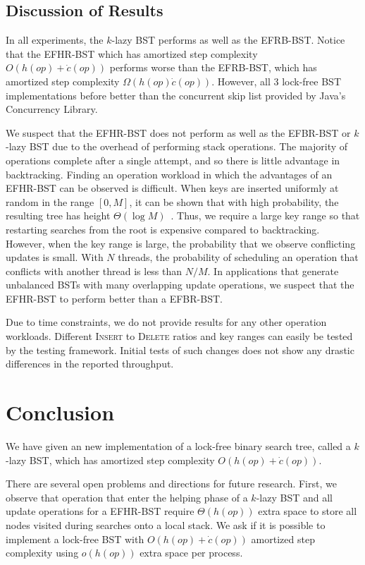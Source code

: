 \documentclass[letterpaper]{article}
\begin{document}
\subsection{Discussion of Results}
In all experiments, the $k$-lazy BST performs as well as the EFRB-BST. Notice that the EFHR-BST which has amortized step complexity $O(h(op) + \dot{c}(op))$ performs worse than the EFRB-BST, which has amortized step complexity $\Omega(h(op)\dot{c}(op))$. However, all 3 lock-free BST implementations before better than the concurrent skip list provided by Java's Concurrency Library. 

We suspect that the EFHR-BST does not perform as well as the EFBR-BST or $k$-lazy BST due to the overhead of performing stack operations. The majority of operations complete after a single attempt, and so there is little advantage in backtracking. Finding an operation workload in which the advantages of an EFHR-BST can be observed is difficult. When keys are inserted uniformly at random in the range $[0,M]$, it can be shown that with high probability, the resulting tree has height $\Theta(\log M)$~\cite{CLRS}. Thus, we require a large key range so that restarting searches from the root is expensive compared to backtracking. However, when the key range is large, the probability that we observe conflicting updates is small. With $N$ threads, the probability of scheduling an operation  that conflicts with another thread is less than $N/M$. In applications that generate unbalanced BSTs with many overlapping update operations, we suspect that the EFHR-BST to perform better than a EFBR-BST. 

Due to time constraints, we do not provide results for any other operation workloads. Different \textsc{Insert} to \textsc{Delete} ratios and key ranges can easily be tested by the testing framework. Initial tests of such changes does not show any drastic differences in the reported throughput.

\section{Conclusion}\label{section_conclusion}
We have given an new implementation of a lock-free binary search tree, called a $k$-lazy BST, which has amortized step complexity $O(h(op) + \dot{c}(op))$. 

There are several open problems and directions for future research. First, we observe that operation that enter the helping phase of a $k$-lazy BST and all update operations for a EFHR-BST require $\Theta(h(op))$ extra space to store all nodes visited during searches onto a local stack. We ask if it is possible to implement a lock-free BST with $O(h(op) + \dot{c}(op))$ amortized step complexity using $o(h(op))$ extra space per process.
\end{document}
